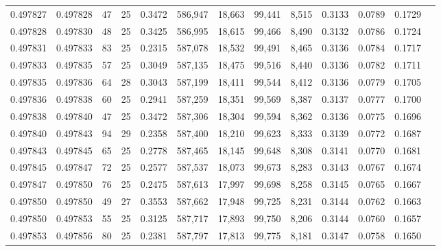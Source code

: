 \begin{tabular}{rrrrrrrrrrrrr}
0.497827 & 0.497828 &  47 &  25 &                                     0.3472 & 586,947 &  18,663 &  99,441 &   8,515 & 0.3133 & 0.0789 & 0.1729 \\
0.497828 & 0.497830 &  48 &  25 &                                     0.3425 & 586,995 &  18,615 &  99,466 &   8,490 & 0.3132 & 0.0786 & 0.1724 \\
0.497831 & 0.497833 &  83 &  25 &                                     0.2315 & 587,078 &  18,532 &  99,491 &   8,465 & 0.3136 & 0.0784 & 0.1717 \\
0.497833 & 0.497835 &  57 &  25 &                                     0.3049 & 587,135 &  18,475 &  99,516 &   8,440 & 0.3136 & 0.0782 & 0.1711 \\
0.497835 & 0.497836 &  64 &  28 &                                     0.3043 & 587,199 &  18,411 &  99,544 &   8,412 & 0.3136 & 0.0779 & 0.1705 \\
0.497836 & 0.497838 &  60 &  25 &                                     0.2941 & 587,259 &  18,351 &  99,569 &   8,387 & 0.3137 & 0.0777 & 0.1700 \\
0.497838 & 0.497840 &  47 &  25 &                                     0.3472 & 587,306 &  18,304 &  99,594 &   8,362 & 0.3136 & 0.0775 & 0.1696 \\
0.497840 & 0.497843 &  94 &  29 &                                     0.2358 & 587,400 &  18,210 &  99,623 &   8,333 & 0.3139 & 0.0772 & 0.1687 \\
0.497843 & 0.497845 &  65 &  25 &                                     0.2778 & 587,465 &  18,145 &  99,648 &   8,308 & 0.3141 & 0.0770 & 0.1681 \\
0.497845 & 0.497847 &  72 &  25 &                                     0.2577 & 587,537 &  18,073 &  99,673 &   8,283 & 0.3143 & 0.0767 & 0.1674 \\
0.497847 & 0.497850 &  76 &  25 &                                     0.2475 & 587,613 &  17,997 &  99,698 &   8,258 & 0.3145 & 0.0765 & 0.1667 \\
0.497850 & 0.497850 &  49 &  27 &                                     0.3553 & 587,662 &  17,948 &  99,725 &   8,231 & 0.3144 & 0.0762 & 0.1663 \\
0.497850 & 0.497853 &  55 &  25 &                                     0.3125 & 587,717 &  17,893 &  99,750 &   8,206 & 0.3144 & 0.0760 & 0.1657 \\
0.497853 & 0.497856 &  80 &  25 &                                     0.2381 & 587,797 &  17,813 &  99,775 &   8,181 & 0.3147 & 0.0758 & 0.1650 \\

\end{tabular}
